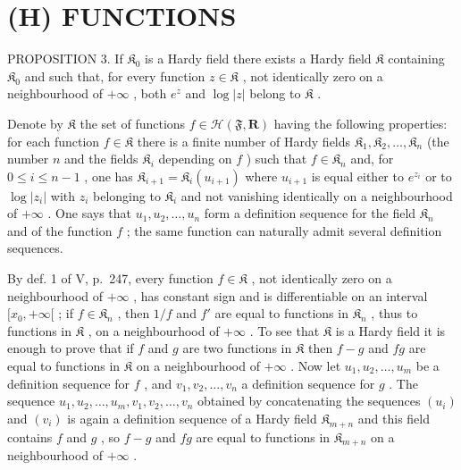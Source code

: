 \section{(H) FUNCTIONS}

PROPOSITION 3. If \(\mathfrak{K}_0\) is a Hardy field there exists a Hardy field \(\mathfrak{K}\) containing \(\mathfrak{K}_0\) and such that, for every function \(z \in \mathfrak{K}\) , not identically zero on a neighbourhood of \(+\infty\) , both \(e^z\) and \(\log |z|\) belong to \(\mathfrak{K}\) .

Denote by \(\mathfrak{K}\) the set of functions \(f\in \mathcal{H}(\mathfrak{F},\mathbf{R})\) having the following properties: for each function \(f\in \mathfrak{K}\) there is a finite number of Hardy fields \(\mathfrak{K}_1,\mathfrak{K}_2,\ldots ,\mathfrak{K}_n\) (the number \(n\) and the fields \(\mathfrak{K}_i\) depending on \(f\) ) such that \(f\in \mathfrak{K}_n\) and, for \(0\leqslant i\leqslant n - 1\) , one has \(\mathfrak{K}_{i + 1} = \mathfrak{K}_i(u_{i + 1})\) where \(u_{i + 1}\) is equal either to \(e^{z_i}\) or to \(\log |z_i|\) with \(z_{i}\) belonging to \(\mathfrak{K}_i\) and not vanishing identically on a neighbourhood of \(+\infty\) . One says that \(u_{1},u_{2},\ldots ,u_{n}\) form a definition sequence for the field \(\mathfrak{K}_n\) and of the function \(f\) ; the same function can naturally admit several definition sequences.

By def. 1 of V, p.~247, every function \(f \in \mathfrak{K}\) , not identically zero on a neighbourhood of \(+\infty\) , has constant sign and is differentiable on an interval \([x_0, +\infty[\) ; if \(f \in \mathfrak{K}_n\) , then \(1/f\) and \(f'\) are equal to functions in \(\mathfrak{K}_n\) , thus to functions in \(\mathfrak{K}\) , on a neighbourhood of \(+\infty\) . To see that \(\mathfrak{K}\) is a Hardy field it is enough to prove that if \(f\) and \(g\) are two functions in \(\mathfrak{K}\) then \(f - g\) and \(fg\) are equal to functions in \(\mathfrak{K}\) on a neighbourhood of \(+\infty\) . Now let \(u_1, u_2, \ldots, u_m\) be a definition sequence for \(f\) , and \(v_1, v_2, \ldots, v_n\) a definition sequence for \(g\) . The sequence \(u_1, u_2, \ldots, u_m, v_1, v_2, \ldots, v_n\) obtained by concatenating the sequences \((u_i)\) and \((v_i)\) is again a definition sequence of a Hardy field \(\mathfrak{K}_{m+n}\) and this field contains \(f\) and \(g\) , so \(f - g\) and \(fg\) are equal to functions in \(\mathfrak{K}_{m+n}\) on a neighbourhood of \(+\infty\) .

